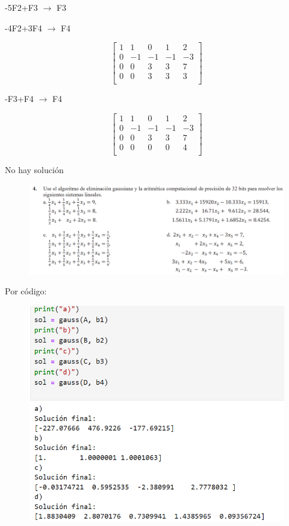 \documentclass[12pt]{article}
\begin{document}
-5F2+F3 $\longrightarrow $ F3

-4F2+3F4 $\longrightarrow $ F4

\[
\begin{bmatrix}
1 & 1 & 0 & 1 & 2 \\
0 & -1 & -1& -1& -3 \\
0 & 0 & 3 & 3 & 7 \\
0 & 0 & 3 & 3 & 3 \\
\end{bmatrix}
\]

-F3+F4 $\longrightarrow $ F4

\[
\begin{bmatrix}
1 & 1 & 0 & 1 & 2 \\
0 & -1 & -1& -1& -3 \\
0 & 0 & 3 & 3 & 7 \\
0 & 0 & 0 & 0 & 4 \\
\end{bmatrix}
\]

No hay solución

\begin{figure}[H]
\includegraphics[width=1\textwidth]{./inFiles/Figures/Ej4.png}
\end{figure}

Por código:
\begin{figure}[H]
\includegraphics[width=1\textwidth]{./inFiles/Figures/PC4.png}
\end{figure}
\end{document}
